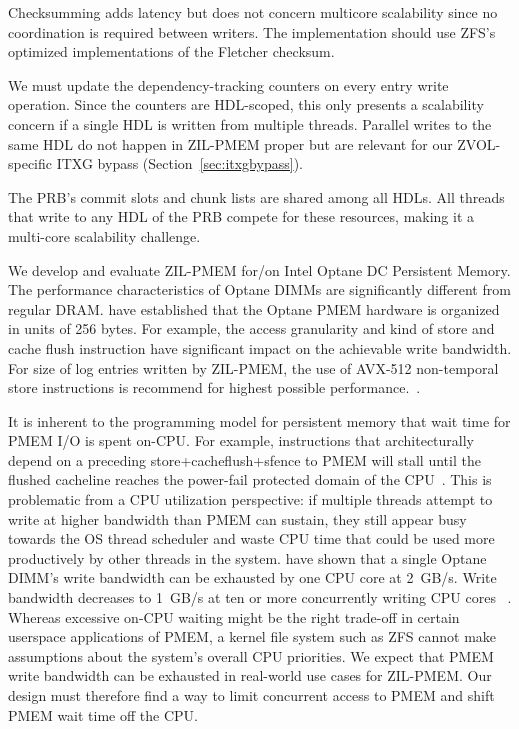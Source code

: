\documentclass[12pt,a4paper,twoside]{book}
\begin{document}
\begin{description}[noitemsep]
    \item[Checksumming] Checksumming adds latency but does not concern multicore scalability since no coordination is required between writers.
        The implementation should use ZFS's optimized implementations of the Fletcher checksum.
    \item[Dependency Tracking Counters] We must update the dependency-tracking counters on every entry write operation.
        Since the counters are HDL-scoped, this only presents a scalability concern if a single HDL is written from multiple threads.
        Parallel writes to the same HDL do not happen in ZIL-PMEM proper but are relevant for our ZVOL-specific ITXG bypass (Section~\ref{sec:itxgbypass}).
    \item[Commit Slot Aquisition \& Chunk Replacement]
        The PRB's commit slots and chunk lists are shared among all HDLs.
        All threads that write to any HDL of the PRB compete for these resources, making it a multi-core scalability challenge.
    \item[Optane Characteristics] We develop and evaluate ZIL-PMEM for/on Intel Optane DC Persistent Memory.
        The performance characteristics of Optane DIMMs are significantly different from regular DRAM.
        \citeauthor{yangEmpiricalGuideBehavior2020} have established that the Optane PMEM hardware is organized in units of 256 bytes.
        For example, the access granularity and kind of store and cache flush instruction have significant impact on the achievable write bandwidth.
        For size of log entries written by ZIL-PMEM, the use of  AVX-512 non-temporal store instructions is recommend for highest possible performance.~\cite{yangEmpiricalGuideBehavior2020}.
    \item[PMEM Bandwidth Limits \& Multicore Scalability]
        It is inherent to the programming model for persistent memory that wait time for PMEM I/O is spent on-CPU.
        For example, instructions that architecturally depend on a preceding store+cacheflush+sfence to PMEM will stall until the flushed cacheline reaches the power-fail protected domain of the CPU~\cite{Scargall2020}.
        This is problematic from a CPU utilization perspective:
        if multiple threads attempt to write at higher bandwidth than PMEM can sustain, they still appear busy towards the OS thread scheduler and waste CPU time that could be used more productively by other threads in the system.
        \citeauthor{yangEmpiricalGuideBehavior2020} have shown that a single Optane DIMM's write bandwidth can be exhausted by one CPU core at \SI{2}{GB/s}.
        Write bandwidth decreases to \SI{1}{GB/s} at ten or more concurrently writing CPU cores ~\cite{yangEmpiricalGuideBehavior2020}.
        Whereas excessive on-CPU waiting might be the right trade-off in certain userspace applications of PMEM, a kernel file system such as ZFS cannot make assumptions about the system's overall CPU priorities.
        We expect that PMEM write bandwidth can be exhausted in real-world use cases for ZIL-PMEM.
        Our design must therefore find a way to limit concurrent access to PMEM and shift PMEM wait time off the CPU.
\end{description}
\end{document}
